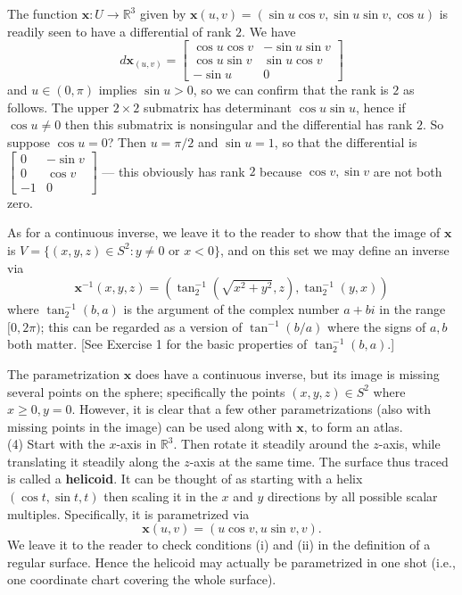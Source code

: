 \documentclass[leqno]{book}
\begin{document}
The function $\mathbf x:U\to\mathbb R^3$ given by $\mathbf x(u,v)=\left(\sin u\cos v,\sin u\sin v,\cos u\right)$ is readily seen to have a differential of rank $2$.  We have
$$d\mathbf x_{(u,v)}=\begin{bmatrix}\cos u\cos v&-\sin u\sin v\\\cos u\sin v&\sin u\cos v\\-\sin u&0\end{bmatrix}$$
and $u\in(0,\pi)$ implies $\sin u>0$, so we can confirm that the rank is $2$ as follows.  The upper $2\times 2$ submatrix has determinant $\cos u\sin u$, hence if $\cos u\ne 0$ then this submatrix is nonsingular and the differential has rank $2$.  So suppose $\cos u=0$?  Then $u=\pi/2$ and $\sin u=1$, so that the differential is $\begin{bmatrix}0&-\sin v\\0&\cos v\\-1&0\end{bmatrix}$ \---- this obviously has rank $2$ because $\cos v,\sin v$ are not both zero.

As for a continuous inverse, we leave it to the reader to show that the image of $\mathbf x$ is $V=\{(x,y,z)\in S^2:y\ne 0\text{ or }x<0\}$, and on this set we may define an inverse via
$$\mathbf x^{-1}(x,y,z)=\left(\tan^{-1}_2(\sqrt{x^2+y^2},z),\tan^{-1}_2(y,x)\right)$$
where $\tan^{-1}_2(b,a)$ is the argument of the complex number $a+bi$ in the range $[0,2\pi)$; this can be regarded as a version of $\tan^{-1}(b/a)$ where the signs of $a,b$ both matter.  [See Exercise 1 for the basic properties of $\tan^{-1}_2(b,a)$.]

The parametrization $\mathbf x$ does have a continuous inverse, but its image is missing several points on the sphere; specifically the points $(x,y,z)\in S^2$ where $x\geqslant 0,y=0$.  However, it is clear that a few other parametrizations (also with missing points in the image) can be used along with $\mathbf x$, to form an atlas.\\%

(4) Start with the $x$-axis in $\mathbb R^3$.  Then rotate it steadily around the $z$-axis, while translating it steadily along the $z$-axis at the same time.  The surface thus traced is called a \textbf{helicoid}.  It can be thought of as starting with a helix $(\cos t,\sin t,t)$ then scaling it in the $x$ and $y$ directions by all possible scalar multiples.  Specifically, it is parametrized via
$$\mathbf x(u,v)=(u\cos v,u\sin v,v).$$
We leave it to the reader to check conditions (i) and (ii) in the definition of a regular surface.  Hence the helicoid may actually be parametrized in one shot (i.e., one coordinate chart covering the whole surface).\\ %
\end{document}
